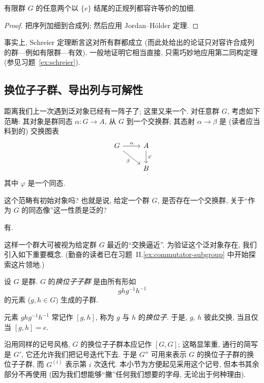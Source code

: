 \begin{proposition}
\label{prop:refinement}
有限群 $G$ 的任意两个以 $\{e\}$ 结尾的正规列都容许等价的加细.
\end{proposition}

\begin{proof}
把序列加细到合成列; 然后应用 Jordan--H\"older 定理.
\end{proof}

事实上, Schreier 定理断言这对所有群都成立 (而此处给出的论证只对容许合成列的群---例如有限群---有效). 一般地证明它相当直接, 只需巧妙地应用第二同构定理 (参见习题~\ref{ex:schreier}).

\subsection{换位子子群、导出列与可解性}
\label{subsec:commutator}

距离我们上一次遇到泛对象已经有一阵子了; 这里又来一个. 对任意群 $G$, 考虑如下范畴: 其对象是群同态 $\alpha : G \to A$, 从 $G$ 到一个交换群; 其态射 $\alpha \to \beta$ 是 (读者应当料到的) 交换图表
\[
\begin{tikzcd}
G \ar[r,"\alpha"] \ar[dr,"\beta"'] & A \ar[d,"\varphi"] \\
& B
\end{tikzcd}
\]
其中 $\varphi$ 是一个同态.

这个范畴有初始对象吗? 也就是说, 给定一个群 $G$, 是否存在一个交换群, 关于``作为 $G$ 的同态像''这一性质是泛的?

有.

这样一个群大可被视为给定群 $G$ 最近的``交换逼近''. 为验证这个泛对象存在, 我们引入如下重要概念. (勤奋的读者已在习题~II.\ref{ex:commutator-subgroup} 中开始探索这片领地.)

\begin{definition}
\label{def:commutator-subgroup}
设 $G$ 是群. $G$ 的\emph{换位子子群}%
%
是由所有形如
\[
ghg^{-1}h^{-1}
\]
的元素 ($g, h \in G$) 生成的子群.
\end{definition}

元素 $ghg^{-1}h^{-1}$ 常记作 $[g,h]$, 称为 $g$ 与 $h$ 的\emph{换位子}. 于是, $g$, $h$ 彼此交换, 当且仅当 $[g,h] = e$.

沿用同样的记号风格, $G$ 的换位子子群本应记作 $[G,G]$; 这略显笨重, 通行的简写是 $G'$, 它还允许我们把记号迭代下去. 于是 $G''$ 可用来表示 $G$ 的换位子子群的换位子子群, 而 $G^{(i)}$ 表示第 $i$ 次迭代. 本小节为方便起见采用这个记号, 但本书其余部分不再使用 (因为我们想能够``撇''任何我们想要的字母, 无论出于何种理由).


